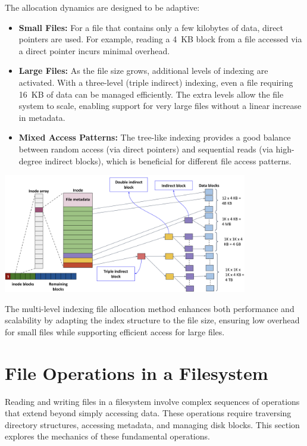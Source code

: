 \documentclass[../../compsys.tex]{subfiles}
\begin{document}
The allocation dynamics are designed to be adaptive:

\begin{itemize}
    \item \textbf{Small Files:} For a file that contains only a few kilobytes of data, direct pointers are used. For example, reading a 4~KB block from a file accessed via a direct pointer incurs minimal overhead.
    
    \item \textbf{Large Files:} As the file size grows, additional levels of indexing are activated. With a three-level (triple indirect) indexing, even a file requiring 16~KB of data can be managed efficiently. The extra levels allow the file system to scale, enabling support for very large files without a linear increase in metadata.
    
    \item \textbf{Mixed Access Patterns:} The tree-like indexing provides a good balance between random access (via direct pointers) and sequential reads (via high-degree indirect blocks), which is beneficial for different file access patterns.
\end{itemize}

\begin{center}
  \includegraphics[width=0.8\textwidth]{chapters/L7/images/multi.png}
\end{center}
The multi-level indexing file allocation method enhances both performance and scalability by adapting the index structure to the file size, ensuring low overhead for small files while supporting efficient access for large files.


\newpage
\section{File Operations in a Filesystem}

Reading and writing files in a filesystem involve complex sequences of operations that extend beyond simply accessing data. These operations require traversing directory structures, accessing metadata, and managing disk blocks. This section explores the mechanics of these fundamental operations.
\end{document}
